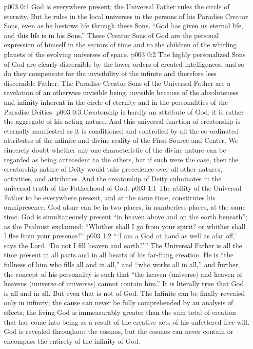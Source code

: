 \author{Divine Counselor}
\vs p003 0:1 God is everywhere present; the Universal Father rules the circle of eternity. But he rules in the local universes in the persons of his Paradise Creator Sons, even as he bestows life through these Sons. “God has given us eternal life, and this life is in his Sons.” These Creator Sons of God are the personal expression of himself in the sectors of time and to the children of the whirling planets of the evolving universes of space.
\vs p003 0:2 The highly personalized Sons of God are clearly discernible by the lower orders of created intelligences, and so do they compensate for the invisibility of the infinite and therefore less discernible Father. The Paradise Creator Sons of the Universal Father are a revelation of an otherwise invisible being, invisible because of the absoluteness and infinity inherent in the circle of eternity and in the personalities of the Paradise Deities.
\pc \vs p003 0:3 Creatorship is hardly an attribute of God; it is rather the aggregate of his acting nature. And this universal function of creatorship is eternally manifested as it is conditioned and controlled by all the co\hyp{}ordinated attributes of the infinite and divine reality of the First Source and Center. We sincerely doubt whether any one characteristic of the divine nature can be regarded as being antecedent to the others, but if such were the case, then the creatorship nature of Deity would take precedence over all other natures, activities, and attributes. And the creatorship of Deity culminates in the universal truth of the Fatherhood of God.
\vs p003 1:1 The ability of the Universal Father to be everywhere present, and at the same time, constitutes his omnipresence. God alone can be in two places, in numberless places, at the same time. God is simultaneously present “in heaven above and on the earth beneath”; as the Psalmist exclaimed: “Whither shall I go from your spirit? or whither shall I flee from your presence?”
\vs p003 1:2 “‘I am a God at hand as well as afar off,’ says the Lord. ‘Do not I fill heaven and earth?’” The Universal Father is all the time present in all parts and in all hearts of his far\hyp{}flung creation. He is “the fullness of him who fills all and in all,” and “who works all in all,” and further, the concept of his personality is such that “the heaven (universe) and heaven of heavens (universe of universes) cannot contain him.” It is literally true that God is all and in all. But even that is not  of God. The Infinite can be finally revealed only in infinity; the cause can never be fully comprehended by an analysis of effects; the living God is immeasurably greater than the sum total of creation that has come into being as a result of the creative acts of his unfettered free will. God is revealed throughout the cosmos, but the cosmos can never contain or encompass the entirety of the infinity of God.
